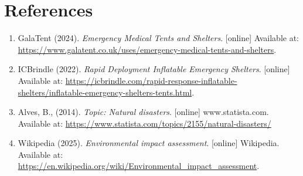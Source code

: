 \documentclass{article}
\begin{document}
\section{References}
\normalsize
\begin{enumerate}
\item GalaTent (2024). \textit{Emergency Medical Tents and Shelters}. [online] Available at: \url{https://www.galatent.co.uk/uses/emergency-medical-tents-and-shelters}.
\item ICBrindle (2022). \textit{Rapid Deployment Inflatable Emergency Shelters}. [online] Available at: \url{https://icbrindle.com/rapid-response-inflatable-shelters/inflatable-emergency-shelters-tents.html}.
\item Alves, B., (2014). \textit{Topic: Natural disasters}. [online] www.statista.com. Available at: \url{https://www.statista.com/topics/2155/natural-disasters/}
\item Wikipedia (2025). \textit{Environmental impact assessment}. [online] Wikipedia. Available at: \url{https://en.wikipedia.org/wiki/Environmental_impact_assessment}.

‌
\end{enumerate}
	
\end{document}
